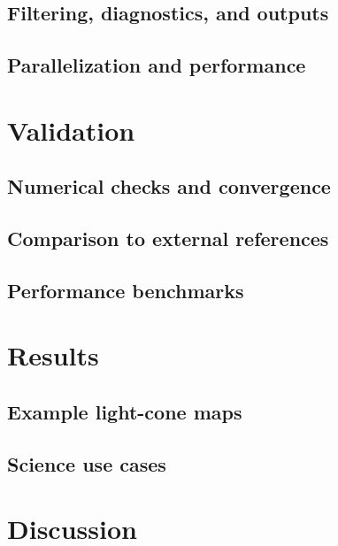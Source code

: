 \documentclass{aa}
\begin{document}
\subsection{Filtering, diagnostics, and outputs}\label{sec:method-filter}
\subsection{Parallelization and performance}\label{sec:method-parallel}

\section{Validation}\label{sec:validation}
\subsection{Numerical checks and convergence}\label{sec:validation-conv}
\subsection{Comparison to external references}\label{sec:validation-compare}
\subsection{Performance benchmarks}\label{sec:validation-perf}

\section{Results}\label{sec:results}
\subsection{Example light-cone maps}\label{sec:results-examples}
\subsection{Science use cases}\label{sec:results-usecases}

\section{Discussion}\label{sec:discussion}

\end{document}
